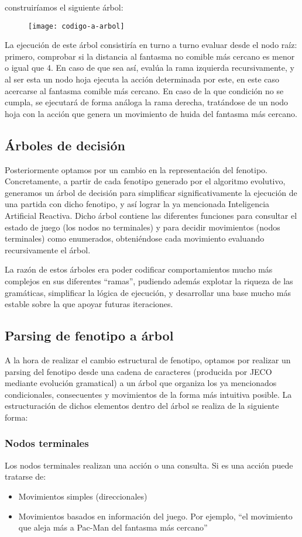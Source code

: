construiríamos el siguiente árbol:
\begin{figure}[H]
\centering
\texttt{[image: codigo-a-arbol]}
\end{figure}
La ejecución de este árbol consistiría en turno a turno evaluar desde el nodo raíz: primero, comprobar si la distancia al fantasma no comible más cercano es menor o igual que 4. En caso de que sea así, evalúa la rama izquierda recursivamente, y al ser esta un nodo hoja ejecuta la acción determinada por este, en este caso acercarse al fantasma comible más cercano. En caso de la que condición no se cumpla, se ejecutará de forma análoga la rama derecha, tratándose de un nodo hoja con la acción que genera un movimiento de huida del fantasma más cercano. 

\subsection{Árboles de decisión}
Posteriormente optamos por un cambio en la representación del fenotipo. Concretamente, a partir de cada fenotipo generado por el algoritmo evolutivo, generamos un árbol de decisión para simplificar significativamente la ejecución de una partida con dicho fenotipo, y así lograr la ya mencionada Inteligencia Artificial Reactiva. Dicho árbol contiene las diferentes funciones para consultar el estado de juego (los nodos no terminales) y para decidir movimientos (nodos terminales) como enumerados, obteniéndose cada movimiento evaluando recursivamente el árbol.
 
La razón de estos árboles era poder codificar comportamientos mucho más complejos en sus diferentes ``ramas'', pudiendo además explotar la riqueza de las gramáticas, simplificar la lógica de ejecución, y desarrollar una base mucho más estable sobre la que apoyar futuras iteraciones.

\subsection{Parsing de fenotipo a árbol}
A la hora de realizar el cambio estructural de fenotipo, optamos por realizar un parsing del fenotipo desde una cadena de caracteres (producida por JECO mediante evolución gramatical) a un árbol que organiza los ya mencionados condicionales, consecuentes y movimientos de la forma más intuitiva posible. La estructuración de dichos elementos dentro del árbol se realiza de la siguiente forma:

\subsubsection{Nodos terminales}
Los nodos terminales realizan una acción o una consulta. Si es una acción puede tratarse de:
\begin{itemize}
\item Movimientos simples (direccionales)
\item Movimientos basados en información del juego. Por ejemplo, ``el movimiento que aleja más a Pac-Man del fantasma más cercano''
\end{itemize}

